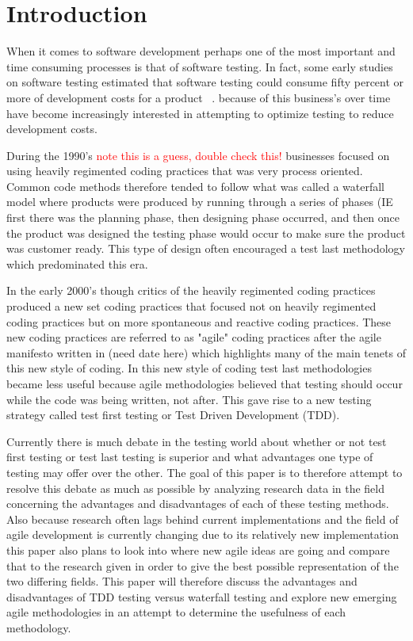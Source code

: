 \documentclass{sig-alternate}
\newcommand{\mycomment}[1]{\textcolor{red}{#1}}
\begin{document}


\section{Introduction}
When it comes to software development perhaps one of the most important and time consuming processes is that of software testing.  In fact, some early studies on software testing estimated that software testing could consume fifty percent or more of development costs for a product ~\cite{Bertolino;2007}.  because of this business's over time have become increasingly interested in attempting to optimize testing to reduce development costs.

During the 1990's \mycomment{note this is a guess, double check this!} businesses focused on using heavily regimented coding practices that was very process oriented.  Common code methods therefore tended to follow what was called a waterfall model where products were produced by running through a series of phases (IE first there was the planning phase, then designing phase
occurred, and then once the product was designed the testing phase would occur to make sure the product was customer ready. This type of design often encouraged a test last methodology which predominated this era.

In the early 2000's though critics of the heavily regimented coding practices produced a new set coding practices that focused not on heavily regimented coding practices but on more spontaneous and reactive coding practices.  These new coding practices are referred to as "agile" coding practices after the agile manifesto written in (need date here) which highlights many of the main tenets of this new style of coding.  In this new style of coding test last methodologies became less useful because agile methodologies believed that testing should occur while the code was being written, not after.  This gave rise to a new testing strategy called test first testing or Test Driven Development (TDD).

Currently there is much debate in the testing world about whether or not test first testing or test last testing is superior and what advantages one type of testing may offer over the other.  The goal of this paper is to therefore attempt to resolve this debate as much as possible by analyzing research data in the field concerning the advantages and disadvantages of each of these testing methods.  Also because research often lags behind current implementations and the field of agile development is currently changing due to its relatively new implementation this paper also plans to look into where new agile ideas are going and compare that to the research given in order to give the best possible representation of the two differing fields.  This paper will therefore discuss the advantages and disadvantages of TDD testing versus waterfall testing and explore new emerging agile methodologies in an attempt to determine the usefulness of each methodology.
\end{document}
